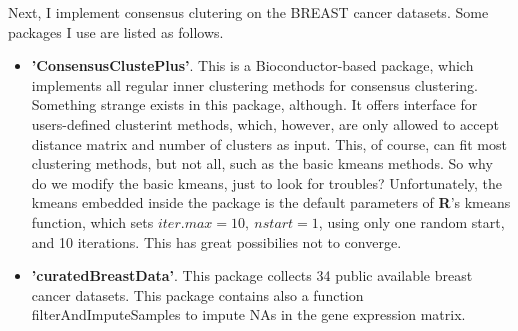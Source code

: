 \documentclass[12pt]{article}
\begin{document}
 Next, I implement consensus clutering on the BREAST cancer datasets. Some
 packages I use are listed as follows.
 \begin{itemize}
 \item {\bf \color{blue}'ConsensusClustePlus'}. This is a Bioconductor-based package, which
   implements all regular inner clustering methods for consensus clustering.
   Something strange exists in this package, although. It offers
   interface for users-defined clusterint methods, which, however, are only
   allowed to accept distance matrix and number of clusters as input. This, of
   course, can fit most clustering methods, but not all, such as the basic
   kmeans methods. So why do we modify the basic kmeans, just to look for
   troubles? Unfortunately, the kmeans embedded inside the package is the
   default parameters of {\bf R}'s kmeans function, which sets $iter.max=10,\
   nstart=1$, using only one random start, and 10 iterations. This has great
   possibilies not to converge.
 \item {\bf\color{blue}'curatedBreastData'}. This package collects 34 public
   available breast cancer datasets. This package contains also a function
   {\color{blue}filterAndImputeSamples } to impute NAs in the gene expression matrix.
 \end{itemize}
\end{document}
